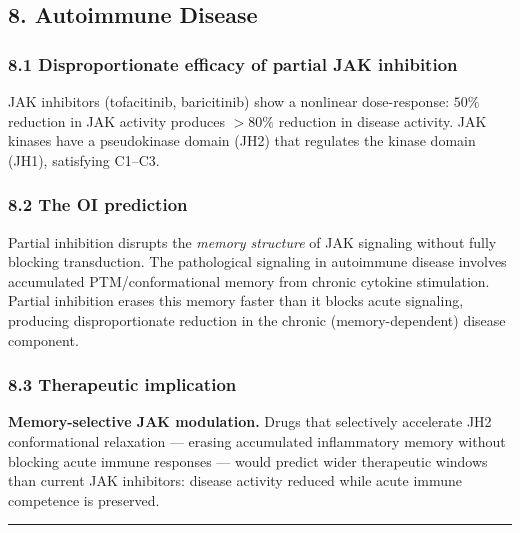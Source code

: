 \documentclass[
]{article}
\begin{document}
\hypertarget{autoimmune-disease}{%
\subsection{8. Autoimmune Disease}\label{autoimmune-disease}}

\hypertarget{disproportionate-efficacy-of-partial-jak-inhibition}{%
\subsubsection{8.1 Disproportionate efficacy of partial JAK
inhibition}\label{disproportionate-efficacy-of-partial-jak-inhibition}}

JAK inhibitors (tofacitinib, baricitinib) show a nonlinear
dose-response: \(50\%\) reduction in JAK activity produces \(> 80\%\)
reduction in disease activity. JAK kinases have a pseudokinase domain
(JH2) that regulates the kinase domain (JH1), satisfying C1--C3.

\hypertarget{the-oi-prediction-3}{%
\subsubsection{8.2 The OI prediction}\label{the-oi-prediction-3}}

Partial inhibition disrupts the \emph{memory structure} of JAK signaling
without fully blocking transduction. The pathological signaling in
autoimmune disease involves accumulated PTM/conformational memory from
chronic cytokine stimulation. Partial inhibition erases this memory
faster than it blocks acute signaling, producing disproportionate
reduction in the chronic (memory-dependent) disease component.

\hypertarget{therapeutic-implication-3}{%
\subsubsection{8.3 Therapeutic
implication}\label{therapeutic-implication-3}}

\textbf{Memory-selective JAK modulation.} Drugs that selectively
accelerate JH2 conformational relaxation --- erasing accumulated
inflammatory memory without blocking acute immune responses --- would
predict wider therapeutic windows than current JAK inhibitors: disease
activity reduced while acute immune competence is preserved.

\begin{center}\rule{0.5\linewidth}{0.5pt}\end{center}
\end{document}
